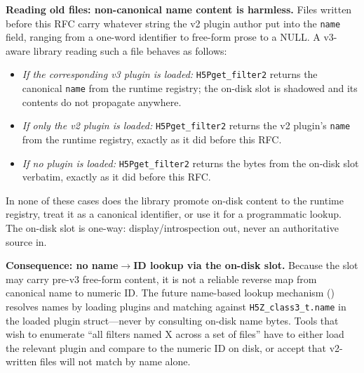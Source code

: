\documentclass[../RFC-HDFG-2026-001.tex]{subfiles}
\begin{document}
\begin{itemize}
  \textbf{Reading old files: non-canonical name content is harmless.}
  Files written before this RFC carry whatever string the v2 plugin
  author put into the \texttt{name} field, ranging from a one-word
  identifier to free-form prose to a NULL.  A v3-aware library
  reading such a file behaves as follows:

  \begin{itemize}
  \item \emph{If the corresponding v3 plugin is loaded:}
    \texttt{H5Pget\_filter2} returns the canonical \texttt{name}
    from the runtime registry; the on-disk slot is shadowed and its
    contents do not propagate anywhere.
  \item \emph{If only the v2 plugin is loaded:} \texttt{H5Pget\_filter2}
    returns the v2 plugin's \texttt{name} from the runtime registry,
    exactly as it did before this RFC.
  \item \emph{If no plugin is loaded:} \texttt{H5Pget\_filter2}
    returns the bytes from the on-disk slot verbatim, exactly as it
    did before this RFC.
  \end{itemize}

  In none of these cases does the library promote on-disk content to
  the runtime registry, treat it as a canonical identifier, or use
  it for a programmatic lookup.  The on-disk slot is one-way:
  display/introspection out, never an authoritative source in.

  \textbf{Consequence: no name$\rightarrow$ID lookup via the on-disk
  slot.}  Because the slot may carry pre-v3 free-form content, it is
  not a reliable reverse map from canonical name to numeric ID.  The
  future name-based lookup mechanism ()
  resolves names by loading plugins and matching against
  \texttt{H5Z\_class3\_t.name} in the loaded plugin struct---never
  by consulting on-disk name bytes.  Tools that wish to enumerate
  ``all filters named X across a set of files'' have to either load
  the relevant plugin and compare to the numeric ID on disk, or
  accept that v2-written files will not match by name alone.


\end{itemize}
\end{document}
